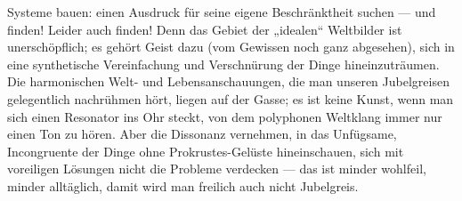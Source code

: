 Systeme bauen: einen Ausdruck für seine eigene Beschränktheit suchen — und finden! Leider auch finden! Denn das Gebiet der „idealen“ Weltbilder ist unerschöpflich; es gehört Geist dazu (vom Gewissen noch ganz abgesehen), sich  in eine synthetische Vereinfachung und Verschnürung der Dinge hineinzuträumen. Die harmonischen Welt- und Lebensanschauungen, die man unseren Jubelgreisen gelegentlich nachrühmen hört, liegen auf der Gasse; es ist keine Kunst, wenn man sich einen Resonator ins Ohr steckt, von dem polyphonen Weltklang immer nur einen Ton zu hören. Aber die Dissonanz vernehmen, in das Unfügsame, Incongruente der Dinge ohne Prokrustes-Gelüste hineinschauen, sich mit voreiligen Lösungen nicht die Probleme verdecken — das ist minder wohlfeil, minder alltäglich, damit wird man freilich auch nicht Jubelgreis.
\par

